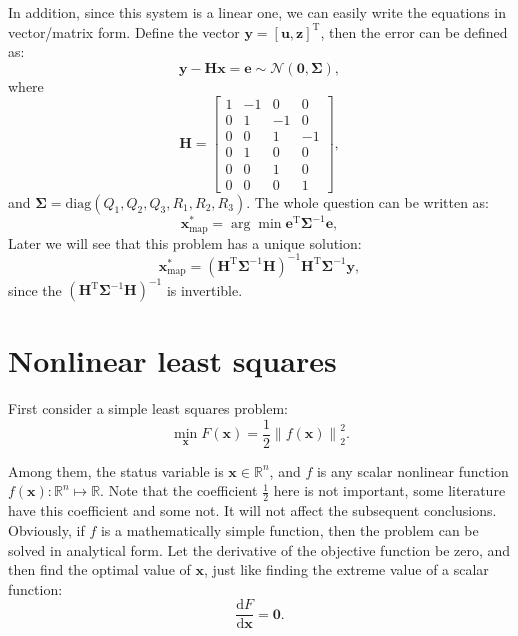 In addition, since this system is a linear one, we can easily write the equations in vector/matrix form. Define the vector $\bm{y}=[\bm{u}, \bm{z}]^\mathrm{T}$, then the error can be defined as: 
\begin{equation}
    \bm{y}-\bm{H}\bm{x} = \bm{e} \sim \mathcal{N}(\bm{0}, \boldsymbol{\Sigma}),
\end{equation}
where
\begin{equation}
    \bm{H} = \left[ {\begin{array}{*{20}{c}}
            1&{-1}&0&0\\
            0&1&{-1}&0\\
            0&0&1&{-1}\\
            \hline
            0&1&0&0\\
            0&0&1&0\\
            0&0&0&1
    \end{array}} \right],
\end{equation}
and $\boldsymbol{\Sigma}=\mathrm{diag}(Q_1, Q_2, Q_3, R_1, R_2, R_3)$. The whole question can be written as:
\begin{equation}
    \bm{x}^*_{\mathrm{map}} = \arg \min \bm{e}^\mathrm{T} \boldsymbol{\Sigma}^{-1} \bm{e},
\end{equation}
Later we will see that this problem has a unique solution:
\begin{equation}
    \bm{x}^*_{\mathrm{map}} = (\bm{H}^\mathrm{T} \boldsymbol{\Sigma}^{-1} \bm{H})^{-1} \bm{H}^\mathrm{T} \boldsymbol{\Sigma}^{-1} \bm{y},
\end{equation}
since the $(\bm{H}^\mathrm{T} \boldsymbol{\Sigma}^{-1} \bm{H})^{-1}$ is invertible.

\section{Nonlinear least squares}
\label{sec:6.2}
First consider a simple least squares problem:
\begin{equation}
    \mathop {\min }\limits_{\bm{x}} F(\bm{x}) = \frac{1}{2}{\left\| {f\left( \bm{x} \right) } \right\|^2_2}.
\end{equation}

Among them, the status variable is $\bm{x} \in \mathbb{R}^n$, and $f$ is any scalar nonlinear function $f(\bm{x}): \mathbb{R}^n \mapsto \mathbb{R}$. Note that the coefficient $\frac{1}{2}$ here is not important, some literature have this coefficient and some not. It will not affect the subsequent conclusions. Obviously, if $f$ is a mathematically simple function, then the problem can be solved in analytical form. Let the derivative of the objective function be zero, and then find the optimal value of $\bm{x}$, just like finding the extreme value of a scalar function:
\begin{equation}
    \frac{ \mathrm{d} F}{ \mathrm{d} \bm{x}} = \bm{0}.
\end{equation}

